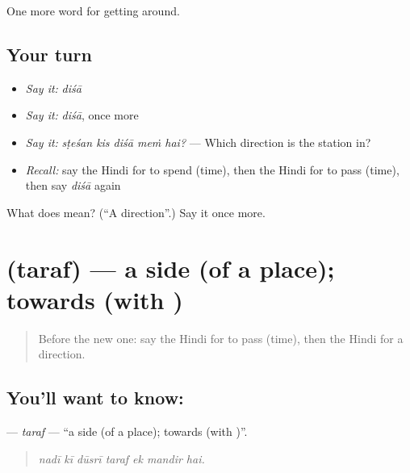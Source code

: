 \begin{grammarlens}[title={What you've built}]
One more word for getting around.
\end{grammarlens}

\subsection*{Your turn}
\begin{itemize}
\raggedright
  \item \emph{Say it:} \emph{diśā}
  \item \emph{Say it:} \emph{diśā}, once more
  \item \emph{Say it:} \emph{sṭeśan kis diśā meṁ hai?} — Which direction is the station in?
  \item \emph{Recall:} say the Hindi for to spend (time), then the Hindi for to pass (time), then say \emph{diśā} again
\end{itemize}

\begin{tcolorbox}[breakable,colback=teal!4,colframe=teal!35!black,title={Before you move on}]
What does  mean? (\textquotedblleft{}A direction\textquotedblright{}.) Say it once more.
\end{tcolorbox}
\section[\texorpdfstring{\hi{तरफ़} (taraf)}{तरफ़ (taraf)}]{ (taraf) — a side (of a place); towards (with )}

\label{lesson:HI-C417-taraf}



\begin{quote}
Before the new one: say the Hindi for to pass (time), then the Hindi for a direction.
\end{quote}

\subsection*{You'll want to know: }
\textbf{} — \emph{taraf} — \textquotedblleft{}a side (of a place); towards (with )\textquotedblright{}.

\begin{quote}
      
\end{quote}

\begin{quote}
\emph{nadī kī dūsrī taraf ek mandir hai.}
\end{quote}

